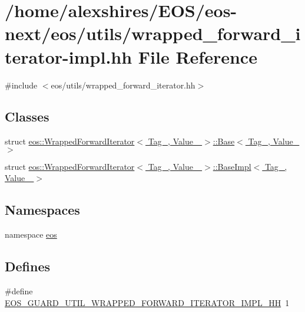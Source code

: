 \hypertarget{wrapped__forward__iterator-impl_8hh}{
\section{/home/alexshires/EOS/eos-\/next/eos/utils/wrapped\_\-forward\_\-iterator-\/impl.hh File Reference}
\label{wrapped__forward__iterator-impl_8hh}
}
{\ttfamily \#include $<$eos/utils/wrapped\_\-forward\_\-iterator.hh$>$}\par
\subsection*{Classes}
\begin{DoxyCompactItemize}
\item 
struct \hyperlink{structeos_1_1WrappedForwardIterator_1_1Base}{eos::WrappedForwardIterator$<$ Tag\_\-, Value\_\- $>$::Base$<$ Tag\_\-, Value\_\- $>$}
\item 
struct \hyperlink{structeos_1_1WrappedForwardIterator_1_1BaseImpl}{eos::WrappedForwardIterator$<$ Tag\_\-, Value\_\- $>$::BaseImpl$<$ Tag\_\-, Value\_\- $>$}
\end{DoxyCompactItemize}
\subsection*{Namespaces}
\begin{DoxyCompactItemize}
\item 
namespace \hyperlink{namespaceeos}{eos}
\end{DoxyCompactItemize}
\subsection*{Defines}
\begin{DoxyCompactItemize}
\item 
\#define \hyperlink{wrapped__forward__iterator-impl_8hh_af72bfca179e2f80dcfff5264bfeaa9fc}{EOS\_\-GUARD\_\-UTIL\_\-WRAPPED\_\-FORWARD\_\-ITERATOR\_\-IMPL\_\-HH}~1
\end{DoxyCompactItemize}


